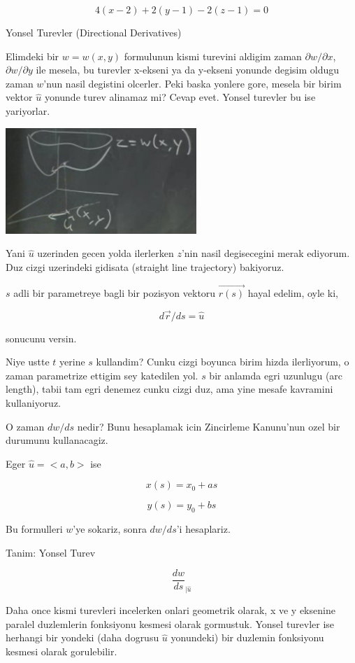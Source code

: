 \documentclass[12pt,fleqn]{article}\usepackage{../common}
\begin{document}
\[ 4(x-2) + 2(y-1) - 2(z-1) = 0 \]

Yonsel Turevler (Directional Derivatives) 

Elimdeki bir $w = w(x,y)$ formulunun kismi turevini aldigim zaman 
$\partial  w/\partial x$, $\partial w/\partial y$ ile mesela, bu turevler x-ekseni ya da y-ekseni 
yonunde degisim oldugu zaman $w$'nun nasil degistini olcerler. Peki baska
yonlere gore, mesela bir birim vektor $\hat{u}$ yonunde turev alinamaz mi? 
Cevap evet. Yonsel turevler bu ise yariyorlar. 

\includegraphics[height=4cm]{12_6.png}

Yani $\hat{u}$ uzerinden gecen yolda ilerlerken $z$'nin nasil degisecegini
merak ediyorum. Duz cizgi uzerindeki gidisata (straight line trajectory)
bakiyoruz.

$s$ adli bir parametreye bagli bir pozisyon vektoru $\vec{r(s)}$ hayal
edelim, oyle ki,

\[ d\vec{r}/ds = \hat{u} \]

sonucunu versin.

Niye ustte $t$ yerine $s$ kullandim? Cunku cizgi boyunca birim hizda
ilerliyorum, o zaman parametrize ettigim sey katedilen yol. $s$ bir anlamda
egri uzunlugu (arc length), tabii tam egri denemez cunku cizgi duz, ama
yine mesafe kavramini kullaniyoruz.

O zaman $dw/ds$ nedir? Bunu hesaplamak icin Zincirleme Kanunu'nun ozel bir
durumunu kullanacagiz.

Eger $\hat{u} = <a,b>$ ise

\[ x(s) = x_0 + as \]

\[ y(s) = y_0 + bs \]

Bu formulleri $w$'ye sokariz, sonra $dw/ds$'i hesaplariz. 

Tanim: Yonsel Turev

\[ \frac{dw}{ds}_{|\hat{u}} \]

Daha once kismi turevleri incelerken onlari geometrik olarak, x ve y
eksenine paralel duzlemlerin fonksiyonu kesmesi olarak gormustuk. Yonsel
turevler ise herhangi bir yondeki (daha dogrusu $\hat{u}$ yonundeki) bir
duzlemin fonksiyonu kesmesi olarak gorulebilir.
\end{document}
